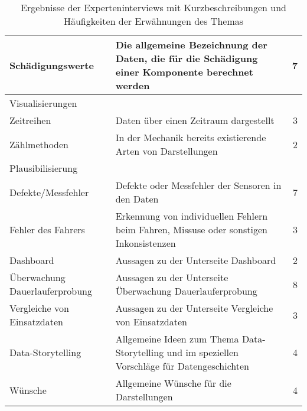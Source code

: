 \begin{table}[h!]
\begin{tabular}{p{4cm}|p{6.7cm}|r}
\hspace{5mm}Schädigungswerte                     & Die allgemeine Bezeichnung der Daten, die für die Schädigung einer Komponente berechnet werden  & 7                              \\ \hline  
Visualisierungen                     &                                                                                                &                                \\
\hspace{5mm}Zeitreihen                           & Daten über einen Zeitraum dargestellt                                                   & 3                              \\
\hspace{5mm}Zählmethoden     & In der Mechanik bereits existierende Arten von Darstellungen                                   & 2                              \\  \hline  
Plausibilisierung                    &                                                                                                &                                \\
\hspace{5mm}Defekte/Messfehler               & Defekte oder Messfehler der Sensoren in den Daten                                              & 7                              \\
\hspace{5mm}Fehler des Fahrers                   & Erkennung von individuellen Fehlern beim Fahren, Missuse oder sonstigen Inkonsistenzen                       & 3                              \\    \hline  
Dashboard                            & Aussagen zu der Unterseite Dashboard                                                           & 2                              \\   \hline  
Überwachung Dauerlauferprobung       & Aussagen zu der Unterseite Überwachung Dauerlauferprobung                                      & 8                              \\   \hline  
Vergleiche von Einsatzdaten          & Aussagen zu der Unterseite Vergleiche von Einsatzdaten                                         & 3                              \\\hline  
Data-Storytelling                    & Allgemeine Ideen zum Thema Data-Storytelling und im speziellen Vorschläge für Datengeschichten & 4                              \\\hline  
Wünsche                              & Allgemeine Wünsche für die Darstellungen                                                       & 4                            
\end{tabular}
\centering
\caption {Ergebnisse der Experteninterviews mit Kurzbeschreibungen und Häufigkeiten der Erwähnungen des Themas}
\end{table}
